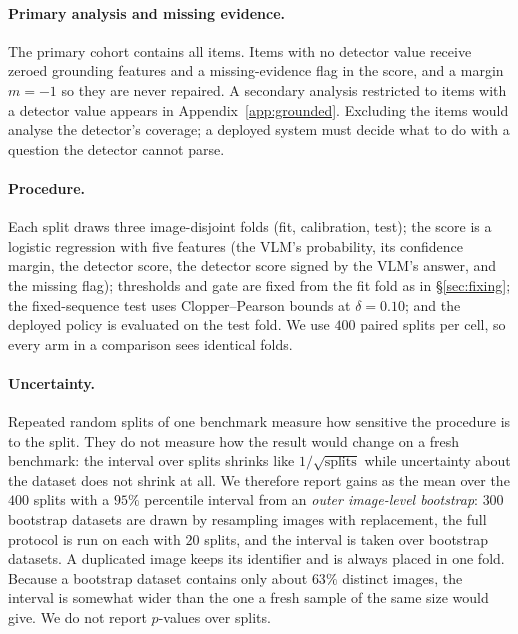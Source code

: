 \begin{table}[t]
\centering
\caption{Cohort flow. ``Detector value'' is the number of items for which the detector returned a score; the
remaining items stay in every analysis, keep the channel-1 decision, and cannot be repaired. In POPE the
exclusions are object phrases the extraction script failed to parse (POPE contains the typo ``imange''); in AMBER
they are the attribute and relation queries, which name no object. ICC is the intra-image correlation of the
model's errors.}
\label{tab:cohort}
\small
\resizebox{\textwidth}{!}{}
\end{table}

\paragraph{Primary analysis and missing evidence.}
The primary cohort contains all items. Items with no detector value receive zeroed grounding features and a
missing-evidence flag in the score, and a margin $m=-1$ so they are never repaired. A secondary analysis restricted to
items with a detector value appears in Appendix~\ref{app:grounded}. Excluding the items would analyse the
detector's coverage; a deployed system must decide what to do with a question the detector cannot parse.

\paragraph{Procedure.}
Each split draws three image-disjoint folds (fit, calibration, test); the score is a logistic regression with five
features (the VLM's probability, its confidence margin, the detector score, the detector score signed by the VLM's
answer, and the missing flag); thresholds and gate are fixed from the fit fold as in \S\ref{sec:fixing}; the
fixed-sequence test uses Clopper--Pearson bounds at $\delta=0.10$; and the deployed policy is evaluated on the test fold.
We use $400$ paired splits per cell, so every arm in a comparison sees identical folds.

\paragraph{Uncertainty.}
Repeated random splits of one benchmark measure how sensitive the procedure is to the split. They do not
measure how the result would change on a fresh benchmark: the interval over splits shrinks like $1/\sqrt{\text{splits}}$ while
uncertainty about the dataset does not shrink at all. We therefore report gains as the mean over the $400$ splits
with a $95\%$ percentile interval from an \emph{outer image-level bootstrap}: $300$ bootstrap datasets
are drawn by resampling images with replacement, the full protocol is run on each with $20$ splits, and the
interval is taken over bootstrap datasets. A duplicated image keeps its identifier and is always placed in one fold. Because a
bootstrap dataset contains only about $63\%$ distinct images, the interval is somewhat wider than the one a
fresh sample of the same size would give. We do not report $p$-values over splits.

